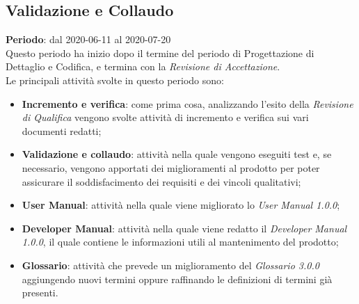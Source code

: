\subsection{Validazione e Collaudo}
\textbf{Periodo}: dal 2020-06-11 al 2020-07-20 \\
Questo periodo ha inizio dopo il termine del periodo di Progettazione di Dettaglio e Codifica, e termina con la \textit{Revisione di Accettazione}. \\
Le principali attività svolte in questo periodo sono:
\begin{itemize}
	\item \textbf{Incremento e verifica}: come prima cosa, analizzando l'esito della \textit{Revisione di Qualifica} vengono svolte attività di incremento e verifica sui vari documenti redatti;
	\item \textbf{Validazione e collaudo}: attività nella quale vengono eseguiti test e, se necessario, vengono apportati dei miglioramenti al prodotto per poter assicurare il soddisfacimento dei requisiti e dei vincoli qualitativi;
	\item \textbf{User Manual}: attività nella quale viene migliorato lo \textit{User Manual 1.0.0};
	\item \textbf{Developer Manual}: attività nella quale viene redatto il \textit{Developer Manual 1.0.0}, il quale contiene le informazioni utili al mantenimento del prodotto;
	\item \textbf{Glossario}: attività che prevede un miglioramento del \textit{Glossario 3.0.0} aggiungendo nuovi termini oppure raffinando le definizioni di termini già presenti.
\end{itemize}
